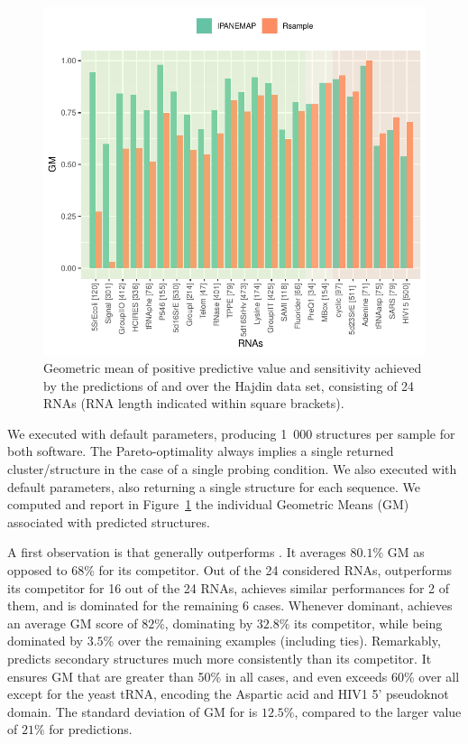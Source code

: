 \documentclass[a4,center,fleqn]{NAR}
\begin{document}
\begin{figure}
	\includegraphics[width=\linewidth]{graphs/RsampleVsIPANEMAP/Accuracy}
	\caption{Geometric mean of positive predictive value and sensitivity achieved by the predictions of \OurTool{} and  over the Hajdin\etal\cite{Hajdin2013} data set, consisting of 24 RNAs (RNA length indicated within square brackets). \label{fig:Vsrsample}}
\end{figure}

We executed \OurTool with default parameters, producing 1~000 structures per sample for both software. The Pareto-optimality always implies a single returned cluster/structure in the case of a single probing condition. 
We also executed  with default parameters, also returning a single structure for each sequence. 
We computed and report in Figure~\ref{fig:Vsrsample} the individual Geometric Means (GM) associated with predicted structures.


A first observation is that \OurTool generally outperforms . It averages $80.1\%$ GM as opposed to $68\%$ for its competitor.  Out of the 24 considered RNAs, \OurTool outperforms its competitor for 16 out of the 24 RNAs, achieves similar performances for 2 of them, and is dominated for the remaining 6 cases. Whenever dominant, \OurTool achieves an average GM score of $82\%$, dominating by $32.8\%$ its competitor, while being dominated by $3.5\%$ over the remaining examples (including ties). 
Remarkably, \OurTool predicts secondary structures much more consistently than its competitor. 
It ensures GM that are greater than 50\% in all cases, and even exceeds 60\% over all except for the yeast tRNA, encoding the Aspartic acid and HIV1 5' pseudoknot domain. The standard deviation of GM for \OurTool is $12.5\%$, compared to the larger value of $21\%$ for  predictions.
\end{document}
